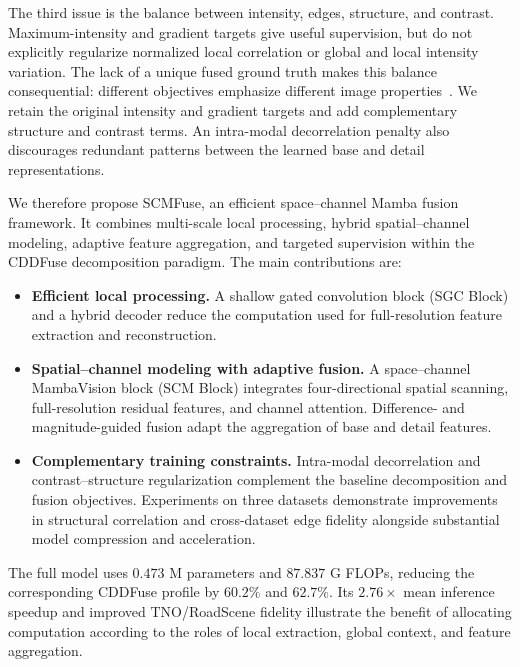 The third issue is the balance between intensity, edges, structure, and contrast. Maximum-intensity and gradient targets give useful supervision, but do not explicitly regularize normalized local correlation or global and local intensity variation. The lack of a unique fused ground truth makes this balance consequential: different objectives emphasize different image properties~\cite{zhao2025freefusion}. We retain the original intensity and gradient targets and add complementary structure and contrast terms. An intra-modal decorrelation penalty also discourages redundant patterns between the learned base and detail representations.

We therefore propose SCMFuse, an efficient space--channel Mamba fusion framework. It combines multi-scale local processing, hybrid spatial--channel modeling, adaptive feature aggregation, and targeted supervision within the CDDFuse decomposition paradigm. The main contributions are:
\begin{itemize}
 \item \textbf{Efficient local processing.} A shallow gated convolution block (SGC Block) and a hybrid decoder reduce the computation used for full-resolution feature extraction and reconstruction.
 \item \textbf{Spatial--channel modeling with adaptive fusion.} A space--channel MambaVision block (SCM Block) integrates four-directional spatial scanning, full-resolution residual features, and channel attention. Difference- and magnitude-guided fusion adapt the aggregation of base and detail features.
 \item \textbf{Complementary training constraints.} Intra-modal decorrelation and contrast--structure regularization complement the baseline decomposition and fusion objectives. Experiments on three datasets demonstrate improvements in structural correlation and cross-dataset edge fidelity alongside substantial model compression and acceleration.
\end{itemize}
The full model uses $0.473$ M parameters and $87.837$ G FLOPs, reducing the corresponding CDDFuse profile by $60.2\%$ and $62.7\%$. Its $2.76\times$ mean inference speedup and improved TNO/RoadScene fidelity illustrate the benefit of allocating computation according to the roles of local extraction, global context, and feature aggregation.
